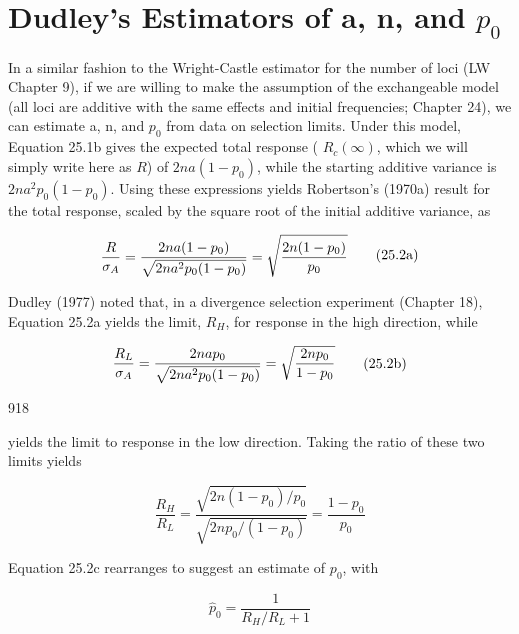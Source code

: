 \documentclass{article}
\begin{document}
\section{Dudley's Estimators of a, n, and  $ p_{0} $}
In a similar fashion to the Wright-Castle estimator for the number of loci (LW Chapter 9), if we are willing to make the assumption of the exchangeable model (all loci are additive with the same effects and initial frequencies; Chapter 24), we can estimate a, n, and  $ p_0 $ from data on selection limits. Under this model, Equation 25.1b gives the expected total response ( $ R_c(\infty) $, which we will simply write here as  $ R $) of  $ 2na(1 - p_0) $, while the starting additive variance is  $ 2na^2p_0(1 - p_0) $. Using these expressions yields Robertson's (1970a) result for the total response, scaled by the square root of the initial additive variance, as

\begin{equation}
\begin{align*}{R\over\sigma_A}={2na(1-p_0)\over\sqrt{2na^2p_0(1-p_0)}}=\sqrt{2n(1-p_0)\over p_0}\end{align*}
\tag{25.2a}
\label{eq:25_2a}
\end{equation}

Dudley (1977) noted that, in a divergence selection experiment (Chapter 18), Equation 25.2a yields the limit,  $ R_{H} $, for response in the high direction, while

\begin{equation}
\begin{align*}{R_L\over\sigma_A}={2nap_0\over\sqrt{2na^2p_0(1-p_0)}}=\sqrt{{2np_0\over1-p_0}}\end{align*}
\tag{25.2b}
\label{eq:25_2b}
\end{equation}

918

yields the limit to response in the low direction. Taking the ratio of these two limits yields

\begin{equation}
\frac{R_{H}}{R_{L}}=\frac{\sqrt{2n(1-p_{0})/p_{0}}}{\sqrt{2np_{0}/(1-p_{0})}}=\frac{1-p_{0}}{p_{0}}
\tag{25.2c}
\label{eq:25_2c}
\end{equation}

Equation 25.2c rearranges to suggest an estimate of  $ p_{0} $, with

\begin{equation}
\widehat{p}_{0}=\frac{1}{R_{H}/R_{L}+1}
\tag{25.2d}
\label{eq:25_2d}
\end{equation}
\end{document}
